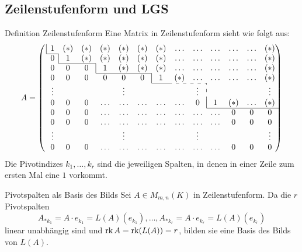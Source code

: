 \documentclass[main.tex]{subfiles}
\begin{document}
\subsection*{Zeilenstufenform und LGS}
\begin{karte}{Definition Zeilenstufenform}
    Eine Matrix in Zeilenstufenform sieht wie folgt aus:
    \begin{equation*}
        A =
        \left(\mkern3mu
          \begin{array}{*{13}c}
            \multicolumn{1}{|c}{1} & (*) & (*) & (*) & (*) & (*) & (*) & \ldots & \ldots & \ldots & \ldots & \ldots & (*) \\
            \cline{1-1}
            0 & \multicolumn{1}{|c}{1} & (*) & (*) & (*) & (*) & (*)  & \ldots & \ldots & \ldots & \ldots & \ldots & (*) \\
            \cline{2-3}
            0 & 0 & 0 & \multicolumn{1}{|c}{1} & (*) & (*) & (*) & \ldots & \ldots & \ldots & \ldots & \ldots & (*)\\
            \cline{4-6}
            0 & 0 & 0 & 0 & 0 & 0 & \multicolumn{1}{|c}{1} & (*) & \ldots & \ldots & \ldots & \ldots & (*) \\
            \cline{7-7}\cdashline{8-9}
            \vdots & & & & \vdots & & & & \vdots & \multicolumn{1}{:c}{} & & & \vdots \\
            0 & 0 & 0 & \ldots & \ldots & \ldots & \ldots & \ldots & 0 & \multicolumn{1}{|c}{1} & (*) & \ldots & (*) \\
            \cline{10-13}
            0 & 0 & 0 & \ldots  & \ldots & \ldots & \ldots & \ldots & \ldots & \ldots & 0 & 0 & 0 \\
            0 & 0 & 0 & \ldots  & \ldots & \ldots & \ldots & \ldots & \ldots & \ldots & 0 & 0 & 0 \\
            \vdots & & & & \vdots & & & & \vdots & & & & \vdots \\
            0 & 0 & 0 & \ldots  & \ldots & \ldots & \ldots & \ldots & \ldots & \ldots & 0 & 0 & 0
          \end{array}
         \hskip-\arraycolsep\right)
      \end{equation*}
      Die Pivotindizes \( k_1,\ldots, k_r \) sind die jeweiligen Spalten, 
      in denen in einer Zeile zum ersten Mal eine \( 1 \) vorkommt.
\end{karte}
\begin{karte}{Pivotspalten als Basis des Bilds}
    Sei \( A \in M_{m,n}(K) \) in Zeilenstufenform.
    Da die \(r\) Pivotspalten 
    \[ A_{*k_1} = A \cdot e_{k_1} = L(A)(e_{k_1}), \ldots, 
    A_{*k_r} = A \cdot e_{k_r} = L(A)(e_{k_r}) \]
    linear unabhängig sind und \( \operatorname{rk} A = \operatorname{rk}(L(A)) = r\), 
    bilden sie eine Basis des Bilds von \( L(A)\).
\end{karte}
\end{document}
